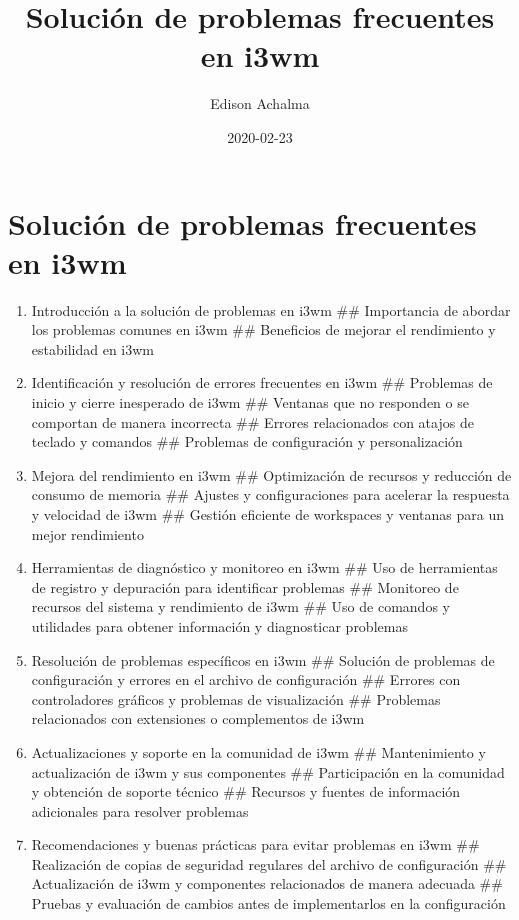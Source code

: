 \documentclass[
  jou,
  floatsintext,
  longtable,
  a4paper,
  nolmodern,
  notxfonts,
  notimes,
  12pt,
  colorlinks=true,linkcolor=blue,citecolor=blue,urlcolor=blue]{apa7}
\title{Solución de problemas frecuentes en i3wm}
\author{Edison Achalma}
\affiliation{
{Escuela Profesional de Economía, Universidad Nacional de San Cristóbal
de Huamanga}}
\date{2020-02-23}
\begin{document}
\maketitle


\hypertarget{toc}{}
\tableofcontents
\newpage
\section[Introduction]{Solución de problemas frecuentes en i3wm}

\setcounter{secnumdepth}{3}

\setlength\LTleft{0pt}




\begin{enumerate}
\def\labelenumi{\arabic{enumi}.}
\item
  Introducción a la solución de problemas en i3wm \#\# Importancia de
  abordar los problemas comunes en i3wm \#\# Beneficios de mejorar el
  rendimiento y estabilidad en i3wm
\item
  Identificación y resolución de errores frecuentes en i3wm \#\#
  Problemas de inicio y cierre inesperado de i3wm \#\# Ventanas que no
  responden o se comportan de manera incorrecta \#\# Errores
  relacionados con atajos de teclado y comandos \#\# Problemas de
  configuración y personalización
\item
  Mejora del rendimiento en i3wm \#\# Optimización de recursos y
  reducción de consumo de memoria \#\# Ajustes y configuraciones para
  acelerar la respuesta y velocidad de i3wm \#\# Gestión eficiente de
  workspaces y ventanas para un mejor rendimiento
\item
  Herramientas de diagnóstico y monitoreo en i3wm \#\# Uso de
  herramientas de registro y depuración para identificar problemas \#\#
  Monitoreo de recursos del sistema y rendimiento de i3wm \#\# Uso de
  comandos y utilidades para obtener información y diagnosticar
  problemas
\item
  Resolución de problemas específicos en i3wm \#\# Solución de problemas
  de configuración y errores en el archivo de configuración \#\# Errores
  con controladores gráficos y problemas de visualización \#\# Problemas
  relacionados con extensiones o complementos de i3wm
\item
  Actualizaciones y soporte en la comunidad de i3wm \#\# Mantenimiento y
  actualización de i3wm y sus componentes \#\# Participación en la
  comunidad y obtención de soporte técnico \#\# Recursos y fuentes de
  información adicionales para resolver problemas
\item
  Recomendaciones y buenas prácticas para evitar problemas en i3wm \#\#
  Realización de copias de seguridad regulares del archivo de
  configuración \#\# Actualización de i3wm y componentes relacionados de
  manera adecuada \#\# Pruebas y evaluación de cambios antes de
  implementarlos en la configuración
\end{enumerate}
\end{document}
